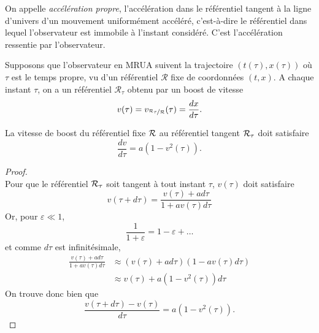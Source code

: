 \documentclass[a4paper,11pt]{report}
\begin{document}
            \begin{definition}
                On appelle \textit{accélération propre}, l'accélération dans le référentiel tangent à la ligne d'univers d'un mouvement uniformément accéléré, c'est-à-dire le référentiel dans lequel l'observateur est immobile à l'instant considéré. C'est l'accélération ressentie par l'observateur.
            \end{definition}
            
            Supposons que l'observateur en MRUA suivent la trajectoire $(t(\tau),x(\tau))$ où $\tau$ est le temps propre, vu d'un référentiel $\mathcal{R}$ fixe de coordonnées $(t,x)$. A chaque instant $\tau$, on a un référentiel $\mathcal{R}_{\tau}$ obtenu par un boost de vitesse
            \begin{equation}
                v(\tau) = v_{\nicefrac{\mathcal{R}_\tau}{\mathcal{R}}}(\tau) = \frac{dx}{d\tau}.
            \end{equation}
            
            \begin{prop}\begin{leftbar}\label{prop:v}
                La vitesse de boost du référentiel fixe $\mathcal{R}$ au référentiel tangent $\mathcal{R}_\tau$ doit satisfaire
                \begin{equation}
                    \frac{dv}{d\tau} = a\left(1-v^2(\tau)\right).
                \end{equation}
            \end{leftbar}\end{prop}
            
            \begin{proof}
            ${}$\\
                Pour que le référentiel $\mathcal{R}_\tau$ soit tangent à tout instant $\tau$, $v(\tau)$ doit satisfaire
            \begin{equation}
                v(\tau+d\tau) = \frac{v(\tau)+ad\tau}{1+av(\tau)d\tau}
            \end{equation}
            Or, pour $\varepsilon\ll 1$,
            \begin{equation}
                \frac{1}{1+\varepsilon} = 1-\varepsilon+\dots
            \end{equation}
            et comme $d\tau$ est infinitésimale,
            \begin{align}
                \frac{v(\tau)+ad\tau}{1+av(\tau)d\tau} &\approx \left(v(\tau)+ad\tau\right)\left( 1-av(\tau)d\tau \right) \\
                &\approx v(\tau) + a\left( 1-v^2(\tau) \right)d\tau
            \end{align}
            On trouve donc bien que 
            \begin{equation}
                \frac{v(\tau+d\tau)-v(\tau)}{d\tau} = a\left( 1-v^2(\tau) \right).
            \end{equation}
            \end{proof}
            
\end{document}
